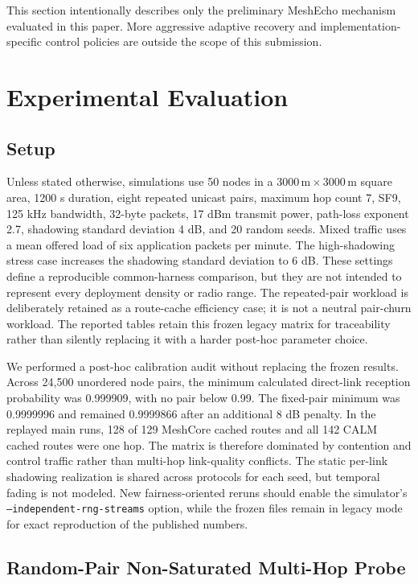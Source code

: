 \documentclass[conference]{IEEEtran}
\begin{document}
This section intentionally describes only the preliminary MeshEcho mechanism
evaluated in this paper. More aggressive adaptive recovery and
implementation-specific control policies are outside the scope of this
submission.

\section{Experimental Evaluation}

\subsection{Setup}

Unless stated otherwise, simulations use 50 nodes in a $3000\,\mathrm{m} \times
3000\,\mathrm{m}$ square area, 1200 s duration, eight repeated unicast pairs,
maximum hop count 7, SF9, 125 kHz bandwidth, 32-byte packets, 17 dBm transmit
power, path-loss exponent 2.7, shadowing standard deviation 4 dB, and 20 random
seeds. Mixed traffic uses a mean offered load of six application packets per
minute. The high-shadowing stress case increases the shadowing standard
deviation to 6 dB. These settings define a reproducible common-harness
comparison, but they are not intended to represent every deployment density or
radio range. The repeated-pair workload is deliberately retained as a
route-cache efficiency case; it is not a neutral pair-churn workload. The
reported tables retain this frozen legacy matrix for traceability rather than
silently replacing it with a harder post-hoc parameter choice.

We performed a post-hoc calibration audit without replacing the frozen
results. Across 24,500 unordered node pairs, the minimum calculated direct-link
reception probability was 0.999909, with no pair below 0.99. The fixed-pair
minimum was 0.9999996 and remained 0.9999866 after an additional 8 dB
penalty. In the replayed main runs, 128 of 129 MeshCore cached routes and all
142 CALM cached routes were one hop. The matrix is therefore dominated by
contention and control traffic rather than multi-hop link-quality conflicts.
The static per-link shadowing realization is shared across protocols for each
seed, but temporal fading is not modeled. New fairness-oriented reruns should
enable the simulator's \texttt{--independent-rng-streams} option, while the
frozen files remain in legacy mode for exact reproduction of the published
numbers.

\subsection{Random-Pair Non-Saturated Multi-Hop Probe}
\end{document}
